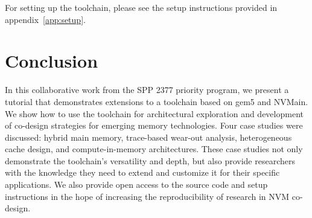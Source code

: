 \documentclass[manuscript,screen]{acmart}
\begin{document}
For setting up the toolchain, please see the setup instructions provided in appendix~\cref{app:setup}.






\section{Conclusion}
In this collaborative work from the SPP 2377 priority program, we present a tutorial that demonstrates extensions to a toolchain based on gem5 and NVMain. We show how to use the toolchain for architectural exploration and development of co-design strategies for emerging memory technologies. Four case studies were discussed: hybrid main memory, trace-based wear-out analysis, heterogeneous cache design, and compute-in-memory architectures. These case studies not only demonstrate the toolchain's versatility and depth, but also provide researchers with the knowledge they need to extend and customize it for their specific applications. We also provide open access to the source code and setup instructions in the hope of increasing the reproducibility of research in NVM co-design.






\end{document}
